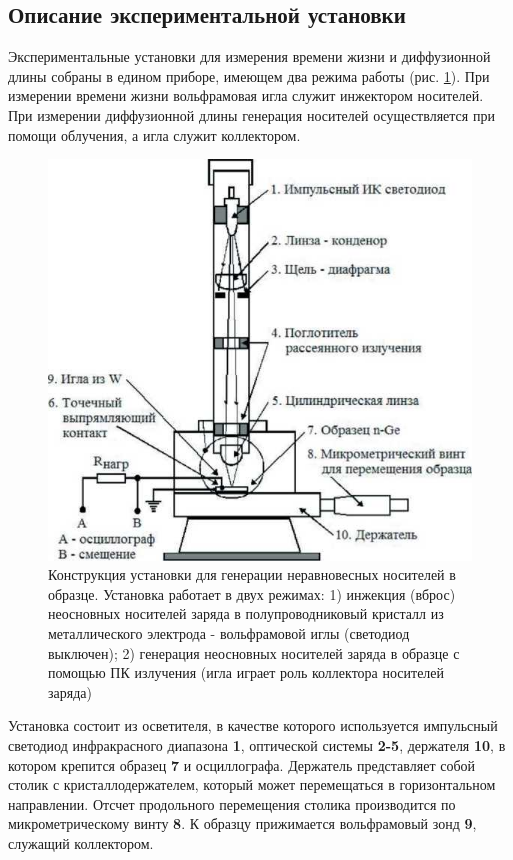 \documentclass[a4paper,12pt]{article}
\begin{document}
\subsection{Описание экспериментальной установки}

Экспериментальные установки для измерения времени жизни и диффузионной длины собраны в едином приборе, имеющем два режима работы (рис.  \ref{fig:figure13}). При измерении времени жизни вольфрамовая игла служит инжектором носителей. При измерении диффузионной длины генерация носителей осуществляется при помощи облучения, а игла служит коллектором.
\begin{figure}[H]
	\centering
	\includegraphics[]{14}
	\caption{Конструкция установки для генерации неравновесных носителей в образце. Установка работает в двух режимах: 1) инжекция (вброс) неосновных носителей заряда в полупроводниковый кристалл из металлического электрода - вольфрамовой иглы (светодиод выключен); 2) генерация неосновных носителей заряда в образце с помощью ПК излучения (игла играет роль коллектора носителей заряда)
}
	\label{fig:figure13}
\end{figure}


Установка состоит из осветителя, в качестве которого используется импульсный светодиод инфракрасного диапазона \textbf{1}, оптической системы \textbf{2-5}, держателя \textbf{10}, в котором крепится образец \textbf{7} и осциллографа. Держатель представляет собой столик с кристаллодержателем, который может перемещаться в горизонтальном направлении. Отсчет продольного перемещения столика производится по микрометрическому винту \textbf{8}. К образцу прижимается вольфрамовый зонд \textbf{9}, служащий коллектором.
\end{document}
